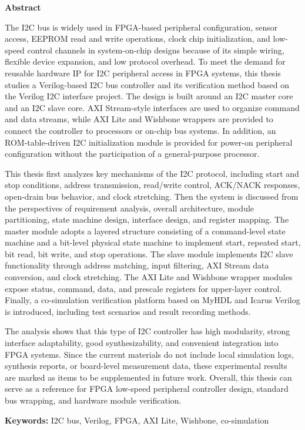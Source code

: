 \documentclass[12pt,a4paper]{article}
\numberwithin{equation}{section}
\newcommand{\sanhao}{\zihao{3}}
\newcommand{\sihao}{\zihao{4}}
\newenvironment{abstracten}{
    \begin{center}
        \textbf{\sanhao Abstract}
    \end{center}
    \addcontentsline{toc}{section}{Abstract}
}{\par}
\newcommand{\keywordsen}[1]{
    \vspace{\baselineskip}
    {\textbf{\sihao Keywords:}} #1
}
\begin{document}
\begin{abstracten}
\par\indent
The I2C bus is widely used in FPGA-based peripheral configuration,
sensor access, EEPROM read and write operations, clock chip
initialization, and low-speed control channels in system-on-chip designs
because of its simple wiring, flexible device expansion, and low
protocol overhead. To meet the demand for reusable hardware IP for I2C
peripheral access in FPGA systems, this thesis studies a Verilog-based
I2C bus controller and its verification method based on the Verilog I2C
interface project. The design is built around an I2C master core and an
I2C slave core. AXI Stream-style interfaces are used to organize command
and data streams, while AXI Lite and Wishbone wrappers are provided to
connect the controller to processors or on-chip bus systems. In
addition, an ROM-table-driven I2C initialization module is provided for
power-on peripheral configuration without the participation of a
general-purpose processor.

This thesis first analyzes key mechanisms of the I2C protocol, including
start and stop conditions, address transmission, read/write control,
ACK/NACK responses, open-drain bus behavior, and clock stretching. Then
the system is discussed from the perspectives of requirement analysis,
overall architecture, module partitioning, state machine design,
interface design, and register mapping. The master module adopts a
layered structure consisting of a command-level state machine and a
bit-level physical state machine to implement start, repeated start, bit
read, bit write, and stop operations. The slave module implements I2C
slave functionality through address matching, input filtering, AXI
Stream data conversion, and clock stretching. The AXI Lite and Wishbone
wrapper modules expose status, command, data, and prescale registers for
upper-layer control. Finally, a co-simulation verification platform
based on MyHDL and Icarus Verilog is introduced, including test
scenarios and result recording methods.

The analysis shows that this type of I2C controller has high modularity,
strong interface adaptability, good synthesizability, and convenient
integration into FPGA systems. Since the current materials do not
include local simulation logs, synthesis reports, or board-level
measurement data, these experimental results are marked as items to be
supplemented in future work. Overall, this thesis can serve as a
reference for FPGA low-speed peripheral controller design, standard bus
wrapping, and hardware module verification.
\end{abstracten}
\keywordsen{I2C bus, Verilog, FPGA, AXI Lite, Wishbone, co-simulation}
\end{document}
